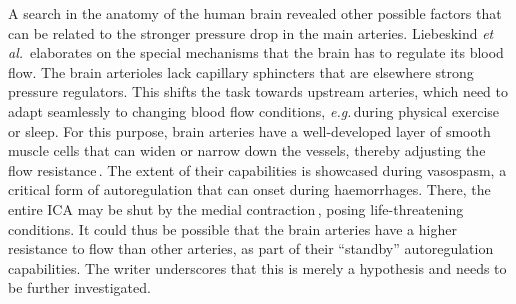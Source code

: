 A search in the anatomy of the human brain revealed other possible factors that can be related to the stronger pressure drop in the main arteries. Liebeskind \textit{et\,al.}\,\cite{Liebeskind2016} elaborates on the special mechanisms that the brain has to regulate its blood flow. The brain arterioles lack capillary sphincters that are elsewhere strong pressure regulators. This shifts the task towards upstream arteries, which need to adapt seamlessly to changing blood flow conditions, \textit{e.g.}\,during physical exercise or sleep. For this purpose, brain arteries have a well-developed layer of smooth muscle cells that can widen or narrow down the vessels, thereby adjusting the flow resistance\,\cite{Liebeskind2016}. The extent of their capabilities is showcased during vasospasm, a critical form of autoregulation that can onset during haemorrhages. There, the entire ICA may be shut by the medial contraction\,\cite{Branko2014}, posing life-threatening conditions. It could thus be possible that the brain arteries have a higher resistance to flow than other arteries, as part of their ``standby'' autoregulation capabilities. The writer underscores that this is merely a hypothesis and needs to be further investigated.

